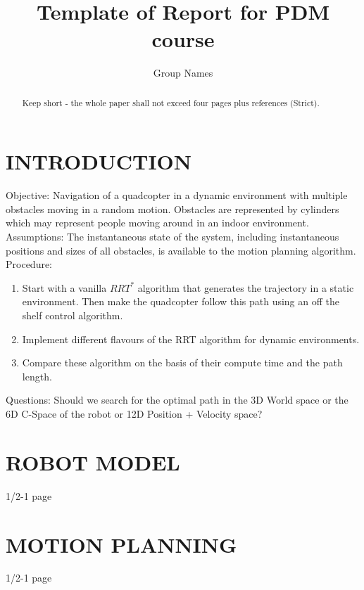 \documentclass[letterpaper, 10 pt, conference]{ieeeconf}  %
\title{\LARGE \bf
Template of Report for PDM course
}
\author{Group Names}%
\begin{document}
\maketitle
\thispagestyle{empty}
\pagestyle{empty}


\begin{abstract}

Keep short - the whole paper shall not exceed four pages plus references (Strict).

\end{abstract}

\section{INTRODUCTION}
Objective: Navigation of a quadcopter in a dynamic environment with multiple obstacles moving in a random motion. Obstacles are represented by cylinders which may represent people moving around in an indoor environment.\\
Assumptions: The instantaneous state of the system, including instantaneous positions and sizes of all obstacles, is available to the motion planning algorithm.\\
Procedure:
\begin{enumerate}
    \item Start with a vanilla \(RRT^*\) algorithm that generates the trajectory in a static environment. Then make the quadcopter follow this path using an off the shelf control algorithm. 
    \item Implement different flavours of the RRT algorithm for dynamic environments. 
    \item Compare these algorithm on the basis of their compute time and the path length.
\end{enumerate}
Questions: Should we search for the optimal path in the 3D World space or the 6D C-Space of the robot or 12D Position + Velocity space?

\section{ROBOT MODEL}
 1/2-1 page
 
\section{MOTION PLANNING}
 1/2-1 page
\end{document}
